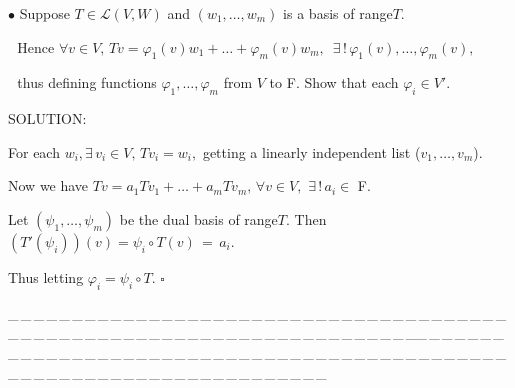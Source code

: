 \documentclass[a4paper, 11pt, UTF8]{article}
\def\Lm{\mathcal{L}}
\begin{document}
\begin{large}
{\small$\bullet$} {\timessl\Large Suppose $T \in \Lm(V, W)$ 
and $(w_{1} , \dots , w_{m})$ is a basis of range$T$.}\par\,\,
{\timessl\Large
Hence $\forall v \in V,\,Tv=\varphi_{1}(v)w_{1}+\dots+\varphi_{m}(v)w_{m},\,\,\,\exists\,!\,\varphi_{1} (v), \dots , \varphi_{m}(v),$}\par\,\,
{\timessl\Large
thus defining functions $\varphi_{1}, \dots , \varphi_{m}$ from $V$ to {\timesbf F}. 
Show that each $\varphi_{i} \in V'$.}\par

{\timesbf S\footnotesize{OLUTION:}} $\,\,$\par\quad
For each $w_{i},\exists\,v_{i} \in V,\,Tv_{i}=w_{i},$
getting a linearly independent list ($v_{1},\dots, v_{m}$).\par\quad
Now we have $Tv=a_{1}Tv_{1}+\dots+a_{m}Tv_{m},\,\forall v \in V,$ $\exists\,!\,a_{i}\in$ {\timesbf F}$.$\par\quad
Let $(\psi_{1}, \dots, \psi_{m})$ be the dual basis of range$T$. Then $(T'(\psi_{i}))(v)=\psi_{i}\circ T(v)\,=\,a_{i}.$\par\quad
Thus letting $\varphi_{i}=\psi_{i}\circ T.$ \quad$\square$

{\tiny \_\,\_\,\_\,\_\,\_\,\_\,\_\,\_\,\_\,\_\,\_\,\_\,\_\,\_\,\_\,\_\,\_\,\_\,\_\,\_\,\_\,\_\,\_\,\_\,\_\,\_\,\_\,\_\,\_\,\_\,\_\,\_\,\_\,\_\,\_\,\_\,\_\,\_\,\_\,\_\,\_\,\_\,\_\,\_\,\_\,\_\,\_\,\_\,\_\,\_\,\_\,\_\,\_\,\_\,\_\,\_\,\_\,\_\,\_\,\_\,\_\,\_\,\_\,\_\,\_\,\_\,\_\,\_\,\_\,\_\,\_\_\,\_\,\_\,\_\,\_\,\_\,\_\,\_\,\_\,\_\,\_\,\_\,\_\,\_\,\_\,\_\,\_\,\_\,\_\,\_\,\_\,\_\,\_\,\_\,\_\,\_\,\_\,\_\,\_\,\_\,\_\,\_\,\_\,\_\,\_\,\_\,\_\,\_\,\_\,\_\,\_\,\_\,\_\,\_\,\_\,\_\,\_\,\_\,\_\,\_\,\_\,\_\,\_\,\_\,\_\,\_\,\_\,\_\,\_\,\_\,\_\,\_\,\_\,\_\,\_\,\_\,\_\,\_\,\_\,\_\,\_}{\tiny\,\par}


\end{large}
\end{document}
